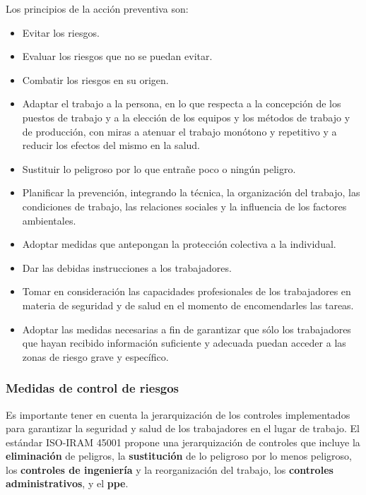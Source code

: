 Los principios de la acción preventiva son:

\begin{itemize}
	\item Evitar los riesgos.
	\item Evaluar los riesgos que no se puedan evitar.
	\item Combatir los riesgos en su origen.
	\item Adaptar el trabajo a la persona, en lo que respecta a la concepción 
        de los puestos de trabajo y a la elección de los equipos y los métodos 
        de trabajo y de producción, con miras a atenuar el trabajo monótono y 
        repetitivo y a reducir los efectos del mismo en la salud.
	\item Sustituir lo peligroso por lo que entrañe poco o ningún peligro.
	\item Planificar la prevención, integrando la técnica, la organización del 
        trabajo, las condiciones de trabajo, las relaciones sociales y la 
        influencia de los factores ambientales.
	\item Adoptar medidas que antepongan la protección colectiva a la 
        individual.
	\item Dar las debidas instrucciones a los trabajadores.
	\item Tomar en consideración las capacidades profesionales de los 
        trabajadores en materia de seguridad y de salud en el momento de 
        encomendarles las tareas.
	\item Adoptar las medidas necesarias a fin de garantizar que sólo los 
        trabajadores que hayan recibido información suficiente y adecuada 
        puedan acceder a las zonas de riesgo grave y específico.
\end{itemize}

\subsubsection{Medidas de control de riesgos}

Es importante tener en cuenta la jerarquización de los controles implementados 
para garantizar la seguridad y salud de los trabajadores en el lugar de 
trabajo. El estándar ISO-IRAM 45001 propone una jerarquización de controles que
incluye la \textbf{eliminación} de peligros, la \textbf{sustitución} de lo 
peligroso por lo menos peligroso, los \textbf{controles de ingeniería} y la 
reorganización del trabajo, los \textbf{controles administrativos}, y el 
\textbf{\acrshort{ppe}}.

